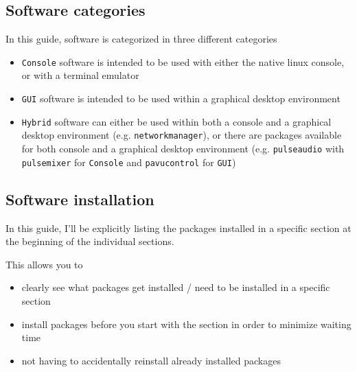 \documentclass[10pt]{dustdoc}
\begin{document}

\subsection{Software categories}
\label{sec:software-categories}

In this guide, software is categorized in three different categories

\begin{itemize}
    \item \texttt{Console} software is intended to be used with either the native linux console, or with a terminal emulator

    \item \texttt{GUI} software is intended to be used within a graphical desktop environment

    \item \texttt{Hybrid} software can either be used within both a console and a graphical desktop environment (e.g. \texttt{networkmanager}), or there are packages available for both console and a graphical desktop environment (e.g. \texttt{pulseaudio} with \texttt{pulsemixer} for \texttt{Console} and \texttt{pavucontrol} for \texttt{GUI})
\end{itemize}

\subsection{Software installation}
\label{sec:software-installation}

In this guide, I’ll be explicitly listing the packages installed in a specific section at the beginning of the individual sections.

This allows you to

\begin{itemize}
    \item clearly see what packages get installed / need to be installed in a specific section

    \item install packages before you start with the section in order to minimize waiting time

    \item not having to accidentally reinstall already installed packages
\end{itemize}
\end{document}
